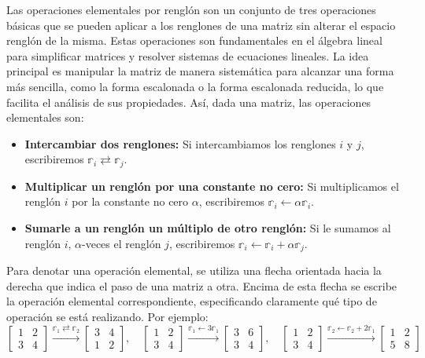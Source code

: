 Las operaciones elementales por renglón son un conjunto de tres operaciones básicas que se pueden aplicar a los renglones de una matriz sin alterar el espacio renglón de la misma. Estas operaciones son fundamentales en el álgebra lineal para simplificar matrices y resolver sistemas de ecuaciones lineales. La idea principal es manipular la matriz de manera sistemática para alcanzar una forma más sencilla, como la forma escalonada o la forma escalonada reducida, lo que facilita el análisis de sus propiedades. Así, dada una matriz, las operaciones elementales son:
\begin{itemize}
    \item \textbf{Intercambiar dos renglones:} Si intercambiamos los renglones $i$ y $j$, escribiremos $\mathbb{r}_i \rightleftarrows \mathbb{r}_j$.
    \item \textbf{Multiplicar un renglón por una constante no cero:} Si multiplicamos el renglón $i$ por la constante no cero $\alpha$, escribiremos $\mathbb{r}_i \leftarrow \alpha\mathbb{r}_i$.
    \item \textbf{Sumarle a un renglón un múltiplo de otro renglón:} Si le sumamos al renglón $i$, $\alpha$-veces el renglón $j$, escribiremos $\mathbb{r}_i \leftarrow \mathbb{r}_i + \alpha\mathbb{r}_j$.
\end{itemize}
Para denotar una operación elemental, se utiliza una flecha orientada hacia la derecha que indica el paso de una matriz a otra. Encima de esta flecha se escribe la operación elemental correspondiente, especificando claramente qué tipo de operación se está realizando. Por ejemplo:
$$\begin{bmatrix}
    1 & 2 \\
    3 & 4
\end{bmatrix} \xrightarrow{\mathbb{r}_1 \rightleftarrows \mathbb{r}_2} \begin{bmatrix}
    3 & 4 \\
    1 & 2
\end{bmatrix}, \quad \begin{bmatrix}
    1 & 2 \\
    3 & 4
\end{bmatrix} \xrightarrow{\mathbb{r}_1 \leftarrow 3\mathbb{r}_1} \begin{bmatrix}
    3 & 6 \\
    3 & 4
\end{bmatrix}, \quad \begin{bmatrix}
    1 & 2 \\
    3 & 4
\end{bmatrix} \xrightarrow{\mathbb{r}_2 \leftarrow \mathbb{r}_2 + 2\mathbb{r}_1} \begin{bmatrix}
    1 & 2 \\
    5 & 8
\end{bmatrix}$$

